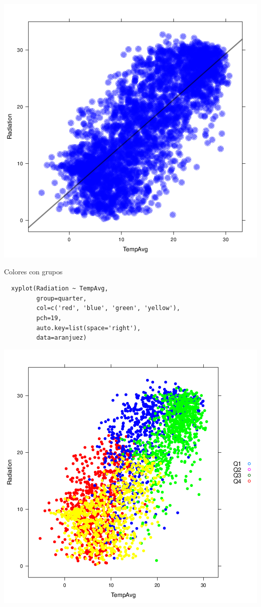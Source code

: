 \documentclass[xcolor={usenames,svgnames,dvipsnames}]{beamer}
\begin{document}
\begin{frame}[label=sec-3-19]{}
\includegraphics[width=.9\linewidth]{figs/xyplotColors.png}
\end{frame}

\begin{frame}[fragile,label=sec-3-20]{Colores con grupos}
 \lstset{language=R,label= ,caption= ,numbers=none}
\begin{lstlisting}
  xyplot(Radiation ~ TempAvg,
         group=quarter,
         col=c('red', 'blue', 'green', 'yellow'),
         pch=19,
         auto.key=list(space='right'),
         data=aranjuez)
\end{lstlisting}
\end{frame}

\begin{frame}[label=sec-3-21]{}
\includegraphics[width=.9\linewidth]{figs/xyplotColorGroups.png}
\end{frame}
\end{document}
